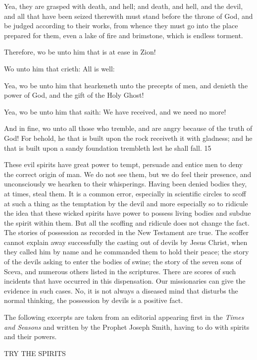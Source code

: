 Yea, they are grasped with death, and hell; and death, and hell, and the devil, and all that
have been seized therewith must stand before the throne of God, and be judged according to
their works, from whence they must go into the place prepared for them, even a lake of fire
and brimstone, which is endless torment.

Therefore, wo be unto him that is at ease in Zion!

Wo unto him that crieth: All is well:

Yea, wo be unto him that hearkeneth unto the precepts of men, and denieth the power of
God, and the gift of the Holy Ghost!

Yea, wo be unto him that saith: We have received, and we need no more!

And in fine, wo unto all those who tremble, and are angry because of the truth of God! For
behold, he that is built upon the rock receiveth it with gladness; and he that is built upon a
sandy foundation trembleth lest he shall fall. 15

These evil spirits have great power to tempt, persuade and entice men to deny the correct
origin of man. We do not see them, but we do feel their presence, and unconsciously we
hearken to their whisperings. Having been denied bodies they, at times, steal them. It is a
common error, especially in scientific circles to scoff at such a thing as the temptation by the
devil and more especially so to ridicule the idea that these wicked spirits have power to
possess living bodies and subdue the spirit within them. But all the scoffing and ridicule does
not change the fact. The stories of possession as recorded in the New Testament are true. The
scoffer cannot explain away successfully the casting out of devils by Jesus Christ, when they
called him by name and he commanded them to hold their peace; the story of the devils
asking to enter the bodies of swine; the story of the seven sons of Sceva, and numerous
others listed in the scriptures. There are scores of such incidents that have occurred in this
dispensation. Our missionaries can give the evidence in such cases. No, it is not always a
diseased mind that disturbs the normal thinking, the possession by devils is a positive fact.

The following excerpts are taken from an editorial appearing first in the \textit{Times and Seasons}
and written by the Prophet Joseph Smith, having to do with spirits and their powers.

TRY THE SPIRITS

